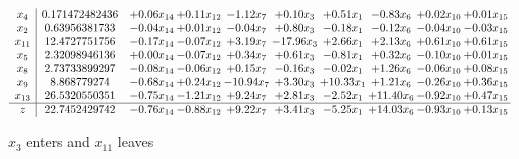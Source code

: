 \documentclass[9pt]{article}
\begin{document}
 \[\begin{array}{c| c c@{\hskip 2pt} c@{\hskip 2pt} c@{\hskip 2pt} c@{\hskip 2pt} c@{\hskip 2pt} c@{\hskip 2pt} c@{\hskip 2pt} c@{\hskip 2pt} }
 x_{4}   &  0.171472482436 & +  0.06 x_{14} & +  0.11 x_{12} & -1.12 x_{7} & +  0.10 x_{3} & +  0.51 x_{1} & -0.83 x_{6} & +  0.02 x_{10} & +  0.01 x_{15}\\
 x_{2}   &  0.63956381733 & -0.04 x_{14} & +  0.01 x_{12} & -0.04 x_{7} & +  0.80 x_{3} & -0.18 x_{1} & -0.12 x_{6} & -0.04 x_{10} & -0.03 x_{15}\\
 x_{11}   &  12.4727751756 & -0.17 x_{14} & -0.07 x_{12} & +  3.19 x_{7} & -17.96 x_{3} & +  2.66 x_{1} & +  2.13 x_{6} & +  0.61 x_{10} & +  0.61 x_{15}\\
 x_{5}   &  2.32098946136 & +  0.00 x_{14} & -0.07 x_{12} & +  0.34 x_{7} & +  0.61 x_{3} & -0.81 x_{1} & +  0.32 x_{6} & -0.10 x_{10} & +  0.01 x_{15}\\
 x_{8}   &  2.73733899297 & -0.08 x_{14} & -0.06 x_{12} & +  0.15 x_{7} & -0.16 x_{3} & -0.02 x_{1} & +  1.26 x_{6} & -0.06 x_{10} & +  0.08 x_{15}\\
 x_{9}   &  8.868779274 & -0.68 x_{14} & +  0.24 x_{12} & -10.94 x_{7} & +  3.30 x_{3} & + 10.33 x_{1} & +  1.21 x_{6} & -0.26 x_{10} & +  0.36 x_{15}\\
 x_{13}   &  26.5320550351 & -0.75 x_{14} & -1.21 x_{12} & +  9.24 x_{7} & +  2.81 x_{3} & -2.52 x_{1} & + 11.40 x_{6} & -0.92 x_{10} & +  0.47 x_{15}\\
\hline
z    &  22.7452429742 & -0.76 x_{14} & -0.88 x_{12} & +  9.22 x_{7} & +  3.41 x_{3} & -5.25 x_{1} & + 14.03 x_{6} & -0.93 x_{10} & +  0.13 x_{15}\\
\end{array}\]


 $ x_{3} $ enters and $ x_{11} $ leaves 
\end{document}
